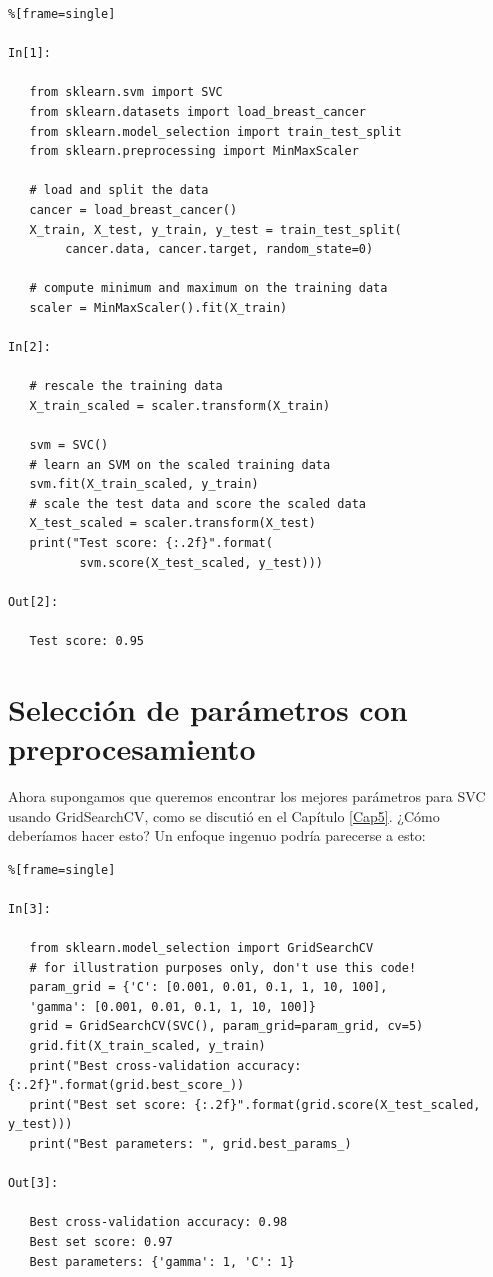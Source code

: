 	
	\begin{lstlisting}%[frame=single]
	
In[1]:
	
   from sklearn.svm import SVC
   from sklearn.datasets import load_breast_cancer
   from sklearn.model_selection import train_test_split
   from sklearn.preprocessing import MinMaxScaler
	
   # load and split the data
   cancer = load_breast_cancer()
   X_train, X_test, y_train, y_test = train_test_split(
        cancer.data, cancer.target, random_state=0)
	
   # compute minimum and maximum on the training data
   scaler = MinMaxScaler().fit(X_train)
	
In[2]:
	
   # rescale the training data
   X_train_scaled = scaler.transform(X_train)
   
   svm = SVC()
   # learn an SVM on the scaled training data
   svm.fit(X_train_scaled, y_train)
   # scale the test data and score the scaled data
   X_test_scaled = scaler.transform(X_test)
   print("Test score: {:.2f}".format(
          svm.score(X_test_scaled, y_test)))
   
Out[2]:
   
   Test score: 0.95      
   \end{lstlisting}      
   
   \section{Selección de parámetros con preprocesamiento}
   
   
   Ahora supongamos que queremos encontrar los mejores parámetros para SVC usando {\ttfamily GridSearchCV}, como se discutió en el Capítulo \ref{Cap5}.  ¿Cómo deberíamos hacer esto?   Un enfoque ingenuo podría parecerse a esto:
   
   \begin{lstlisting}%[frame=single]
   
In[3]:
   
   from sklearn.model_selection import GridSearchCV
   # for illustration purposes only, don't use this code!
   param_grid = {'C': [0.001, 0.01, 0.1, 1, 10, 100],
   'gamma': [0.001, 0.01, 0.1, 1, 10, 100]}
   grid = GridSearchCV(SVC(), param_grid=param_grid, cv=5)
   grid.fit(X_train_scaled, y_train)
   print("Best cross-validation accuracy: {:.2f}".format(grid.best_score_))
   print("Best set score: {:.2f}".format(grid.score(X_test_scaled, y_test)))
   print("Best parameters: ", grid.best_params_)
   
Out[3]:
   
   Best cross-validation accuracy: 0.98
   Best set score: 0.97
   Best parameters: {'gamma': 1, 'C': 1}
   
   \end{lstlisting}
   
